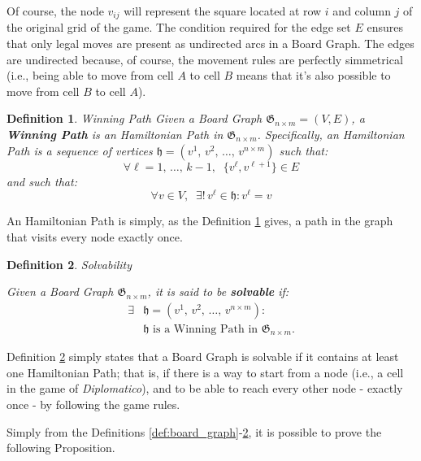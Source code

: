 \documentclass[conference]{IEEEtran}
\newtheorem{definition}{Definition}[section]
\begin{document}
Of course, the node $v_{ij}$ will represent the square located at row $i$ and column $j$ of the original grid of the game. 
The condition required for the edge set $E$ ensures that only legal moves are present as undirected arcs in a Board Graph. The edges are undirected because, of course, the movement rules are perfectly simmetrical (i.e., being able to move from cell $A$ to cell $B$ means that it's also possible to move from cell $B$ to cell $A$).

\begin{definition}{Winning Path}{} \label{def:winning_path}
Given a Board Graph $\mathfrak{G}_{n \times m} = (V, E)$, a \textbf{Winning Path} is an Hamiltonian Path in $\mathfrak{G}_{n \times m}$.
Specifically, an Hamiltonian Path is a sequence of vertices $\mathfrak{h} = (v^1,\,v^2,\,\dots,\,v^{n \times m})$ such that:
$$
    \forall \ell = 1,\,\dots,\,k-1,\;\; \{v^\ell, v^{\ell+1}\} \in E
$$
and such that:
$$
    \forall v \in V,\;\; \exists!\, v^\ell \in \mathfrak{h} : v^\ell = v
$$
\end{definition}

An Hamiltonian Path is simply, as the Definition \ref{def:winning_path} gives, a path in the graph that visits every node exactly once.

\begin{definition}{Solvability}{}
\label{def:solvability}

Given a Board Graph $\mathfrak{G}_{n \times m}$, it is said to be \textbf{solvable} if:
\begin{align*}
    \exists &\mathfrak{h} = (v^1,\,v^2,\,\dots,\,v^{n \times m}) : \\
            &\mathfrak{h} \text{ is a Winning Path in } \mathfrak{G}_{n \times m}.
\end{align*}
\end{definition}

Definition \ref{def:solvability} simply states that a Board Graph is solvable if it contains at least one Hamiltonian Path; that is, if there is a way to start from a node (i.e., a cell in the game of \textit{Diplomatico}), and to be able to reach every other node - exactly once - by following the game rules. 

Simply from the Definitions \ref{def:board_graph}-\ref{def:solvability}, it is possible to prove the following Proposition.
\end{document}
